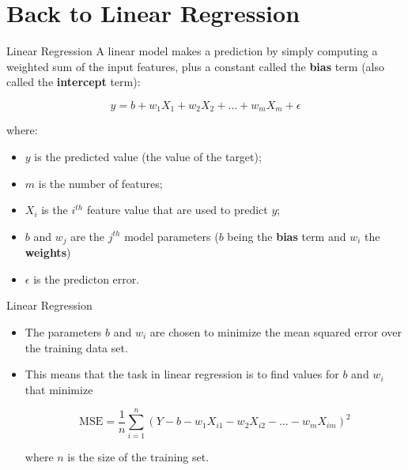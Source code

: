 \documentclass[11pt]{beamer}
\begin{document}
\section{Back to Linear Regression}
\begin{frame}{Linear Regression}
A linear model makes a prediction by simply computing a weighted
sum of the input features, plus a constant called the \textbf{bias} term (also called the \textbf{intercept}
term):

\begin{equation}
y = b + w_1 X_1 + w_2 X_2 + \dots + w_m X_m + \epsilon
\end{equation}

where:
\begin{itemize}
\item $y$ is the predicted value (the value of the target);
\item $m$ is the number of features;
\item $X_i$ is the $i^{th}$ feature value that are used to predict $y$;
\item $b$ and $w_j$ are the $j^{th}$ model parameters ($b$ being the \textbf{bias} term and $w_i$ the \textbf{weights})
\item $\epsilon$ is the predicton error.
\end{itemize}
\end{frame}
\begin{frame}{Linear Regression}
\begin{itemize}
\item The parameters $b$ and $w_i$ are chosen to minimize the mean squared error over the training data set. 

\item This means that the task in linear regression is to find values for $b$ and $w_i$ that minimize

\begin{equation}\text{MSE} = 
\frac{1}{n} \sum\limits_{i=1}^n \left(Y - b - w_1 X_{i1} - w_2 X_{i2} - \dots - w_m X_{im} \right)^2
\end{equation}

where $n$ is the size of the training set. 
\end{itemize}
\end{frame}
\end{document}
